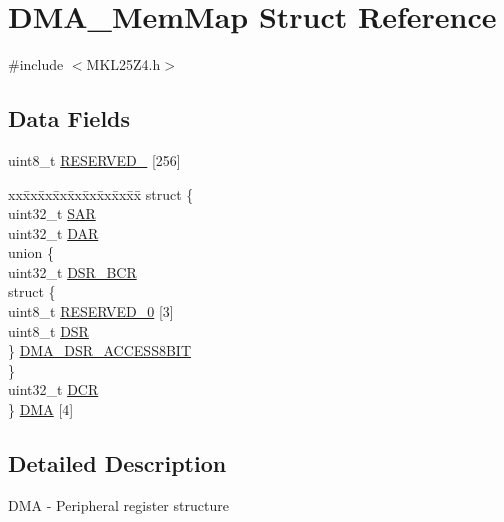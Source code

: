 \hypertarget{struct_d_m_a___mem_map}{}\section{D\+M\+A\+\_\+\+Mem\+Map Struct Reference}
\label{struct_d_m_a___mem_map}


{\ttfamily \#include $<$M\+K\+L25\+Z4.\+h$>$}

\subsection*{Data Fields}
\begin{DoxyCompactItemize}
\item 
uint8\+\_\+t \hyperlink{struct_d_m_a___mem_map_aa8b44414dcc95e749d18ce191f6a5c44}{R\+E\+S\+E\+R\+V\+E\+D\+\_} \mbox{[}256\mbox{]}
\item 
\begin{tabbing}
xx\=xx\=xx\=xx\=xx\=xx\=xx\=xx\=xx\=\kill
struct \{\\
\>uint32\_t \hyperlink{struct_d_m_a___mem_map_a9f71dcd898faa75d4e2d1e8cace3882f}{SAR}\\
\>uint32\_t \hyperlink{struct_d_m_a___mem_map_ab409d052e7a184d36b412e665a1e079a}{DAR}\\
\>union \{\\
\>\>uint32\_t \hyperlink{struct_d_m_a___mem_map_ae7642b2f08448a1bd463111a464f8e46}{DSR\_BCR}\\
\>\>struct \{\\
\>\>\>uint8\_t \hyperlink{struct_d_m_a___mem_map_aa8b44414dcc95e749d18ce191f6a5c44}{RESERVED\_0} \mbox{[}3\mbox{]}\\
\>\>\>uint8\_t \hyperlink{struct_d_m_a___mem_map_af59ac6c373e8107836aab76df475a6cd}{DSR}\\
\>\>\} \hyperlink{struct_d_m_a___mem_map_ab05c4a25e0ecae157a5a23d4aab29f69}{DMA\_DSR\_ACCESS8BIT}\\
\>\} \\
\>uint32\_t \hyperlink{struct_d_m_a___mem_map_a86826ed1a54abd232a0ce7a4bc81201b}{DCR}\\
\} \hyperlink{struct_d_m_a___mem_map_af69a5c0368950940805235ce033b4acc}{DMA} \mbox{[}4\mbox{]}\\

\end{tabbing}\end{DoxyCompactItemize}


\subsection{Detailed Description}
D\+MA -\/ Peripheral register structure 

